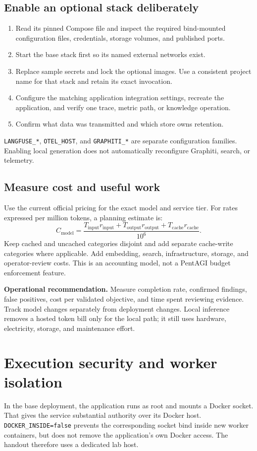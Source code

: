 \documentclass[11pt,letterpaper]{article}
\newcommand{\code}[1]{\nolinkurl{#1}}
\newcommand{\src}[1]{\cite{#1}}
\begin{document}
\subsection{Enable an optional stack deliberately}
\begin{enumerate}
\item Read its pinned Compose file and inspect the required bind-mounted
configuration files, credentials, storage volumes, and published ports.
\item Start the base stack first so its named external networks exist.
\item Replace sample secrets and lock the optional images. Use a consistent
project name for that stack and retain its exact invocation.
\item Configure the matching application integration settings, recreate the
application, and verify one trace, metric path, or knowledge operation.
\item Confirm what data was transmitted and which store owns retention.
\end{enumerate}
\code{LANGFUSE_*}, \code{OTEL_HOST}, and \code{GRAPHITI_*} are separate
configuration families. Enabling local generation does not automatically
reconfigure Graphiti, search, or telemetry. \src{config,graphiti}

\subsection{Measure cost and useful work}
Use the current official pricing for the exact model and service tier.
For rates expressed per million tokens, a planning estimate is:
\[
C_{\text{model}}=
\frac{T_{\text{input}}r_{\text{input}}+
T_{\text{output}}r_{\text{output}}+
T_{\text{cache}}r_{\text{cache}}}{10^6}.
\]
Keep cached and uncached categories disjoint and add separate cache-write
categories where applicable. Add embedding, search, infrastructure, storage,
and operator-review costs. This is an accounting model, not a PentAGI budget
enforcement feature. \src{pricing}

\textbf{Operational recommendation.} Measure completion rate, confirmed
findings, false positives, cost per validated objective, and time spent reviewing
evidence. Track model changes separately from deployment changes. Local
inference removes a hosted token bill only for the local path; it still uses
hardware, electricity, storage, and maintenance effort.

\clearpage
\section{Execution security and worker isolation}
\label{sec:security}
In the base deployment, the application runs as root and mounts a Docker socket.
That gives the service substantial authority over its Docker host.
\code{DOCKER_INSIDE=false} prevents the corresponding socket bind inside new
worker containers, but does not remove the application's own Docker access.
The handout therefore uses a dedicated lab host. \src{compose,docker-code}
\end{document}
